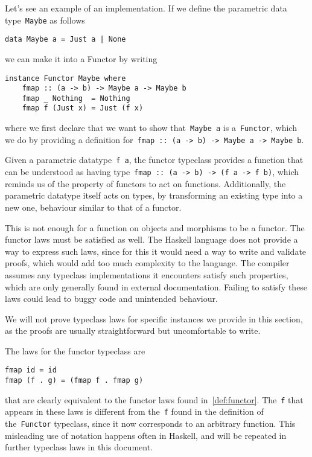 \documentclass[../TFG.tex]{subfiles}
\begin{document}
Let's see an example of an implementation. If we define the parametric data
type~\texttt{Maybe} as follows
\begin{verbatim}
data Maybe a = Just a | None
\end{verbatim}
we can make it into a Functor by writing
\begin{verbatim}
instance Functor Maybe where
    fmap :: (a -> b) -> Maybe a -> Maybe b
    fmap _ Nothing  = Nothing
    fmap f (Just x) = Just (f x)
\end{verbatim}
where we first declare that we want to show that~\texttt{Maybe a}
is a~\texttt{Functor}, which we do by providing a definition
for~\texttt{fmap :: (a -> b) -> Maybe a -> Maybe b}.

Given a parametric datatype~\texttt{f a}, the functor typeclass
provides a function that can be understood as having
type~\texttt{fmap :: (a -> b) -> (f a -> f b)}, which reminds us of
the property of functors to act on functions. Additionally, the parametric
datatype itself acts on types, by transforming an existing type into a new one,
behaviour similar to that of a functor.

This is not enough for a function on objects and morphisms to be a functor. The
functor laws must be satisfied as well. The Haskell language does not provide a
way to express such laws, since for this it would need a way to write and
validate proofs, which would add too much complexity to the language. The
compiler assumes any typeclass implementations it encounters satisfy such
properties, which are only generally found in external documentation. Failing to
satisfy these laws could lead to buggy code and unintended behaviour.

We will not prove typeclass laws for specific instances we provide in this
section, as the proofs are usually straightforward but uncomfortable to write.

The laws for the functor typeclass are
\begin{verbatim}
fmap id = id
fmap (f . g) = (fmap f . fmap g)
\end{verbatim}
that are clearly equivalent to the functor laws found in~\ref{def:functor}.
The~\texttt{f} that appears in these laws is different from
the~\texttt{f} found in the definition of
the~\texttt{Functor} typeclass, since it now corresponds to an
arbitrary function. This misleading use of notation happens often in Haskell,
and will be repeated in further typeclass laws in this document.
\end{document}
